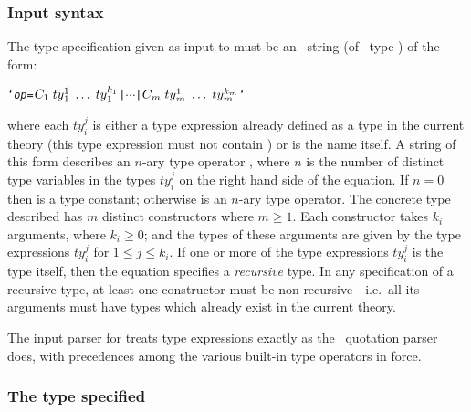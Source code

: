 {{\subsubsection{Input syntax}

The type specification given as input to 
must be an \ML\ string (of \ML\ type ) of the form:

{\def\op{{\normalsize\sl op}}
\begin{hol}\begin{alltt}
   `{\op} = \(C\sb{1}\;ty{}\sb{1}\sp{1}\;\ldots\;ty{}\sb{1}\sp{k\sb{1}} \) | \(\cdots\) | \(C\sb{m}\;ty{}\sb{m}\sp{1}\;\ldots\;ty{}\sb{m}\sp{k\sb{m}}\)`
\end{alltt}\end{hol}}

\noindent where each $ty_i^{j}$ is either a type expression already defined
as a type in the current theory (this type expression must not
contain ) or is the name  itself.  A string of this form
describes an $n$-ary type operator ,
where $n$ is the number of distinct type variables in the types 
$ty_i^{j}$ on the right hand side of the equation.
If $n = 0$ then  is a type constant;
otherwise  is an $n$-ary type operator.  The concrete 
type described has $m$
distinct constructors  where $m \geq 1$.
Each constructor  takes $k_i$ arguments, where $k_i \geq 0$;
and the types of these arguments are given by the type
expressions $ty_i^j$ for $1 \leq j \leq k_i$.  If one or more of the type
expressions $ty_i^{j}$ is the type  itself, then the \mbox{equation}
specifies a {\it recursive\/} type.  In any specification of a recursive type,
at least one constructor must be non-recursive---i.e.\ all its arguments must
have types which already exist in the current theory.

The input parser for  treats type expressions exactly as the
\HOL\ quotation parser does, with precedences among the various built-in type
operators in force.

\subsubsection{The type specified}

}}
